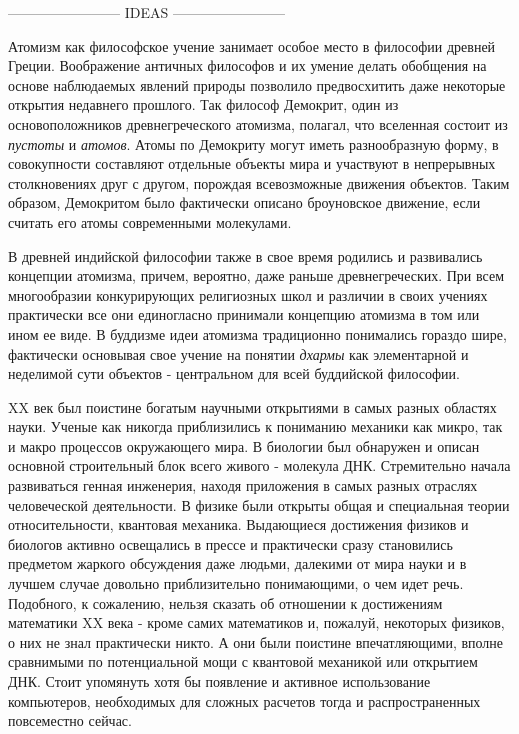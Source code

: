 ------------------------ IDEAS ------------------------ 





Атомизм как философское учение занимает особое место в философии древней Греции.
Воображение античных философов и их умение делать обобщения на основе наблюдаемых явлений природы позволило предвосхитить даже некоторые открытия недавнего прошлого.
Так философ Демокрит, один из основоположников древнегреческого атомизма, полагал, что вселенная состоит из \textit{пустоты} и \textit{атомов}. Атомы по Демокриту могут иметь разнообразную форму, в совокупности составляют отдельные объекты мира и участвуют в непрерывных столкновениях друг с другом, порождая всевозможные движения объектов.
Таким образом, Демокритом было фактически описано броуновское движение, если считать его атомы современными молекулами.

В древней индийской философии также в свое время родились и развивались концепции атомизма, причем, вероятно, даже раньше древнегреческих.
При всем многообразии конкурирующих религиозных школ и различии в своих учениях практически все они единогласно принимали концепцию атомизма в том или ином ее виде.
В буддизме идеи атомизма традиционно понимались гораздо шире, фактически основывая свое учение на понятии \textit{дхармы} как элементарной и неделимой сути объектов - центральном для всей буддийской философии.




XX век был поистине богатым научными открытиями в самых разных областях науки. Ученые как никогда приблизились к пониманию механики как микро, так и макро процессов окружающего мира. В биологии был обнаружен и описан основной строительный блок всего живого - молекула ДНК. Стремительно начала развиваться генная инженерия, находя приложения в самых разных отраслях человеческой деятельности. В физике были открыты общая и специальная теории относительности, квантовая механика. Выдающиеся достижения физиков и биологов активно освещались в прессе и практически сразу становились предметом жаркого обсуждения даже людьми, далекими от мира науки и в лучшем случае довольно приблизительно понимающими, о чем идет речь. 
Подобного, к сожалению, нельзя сказать об отношении к достижениям математики XX века - кроме самих математиков и, пожалуй, некоторых физиков, о них не знал практически никто. А они были поистине впечатляющими, вполне сравнимыми по потенциальной мощи с квантовой механикой или открытием ДНК. Стоит упомянуть хотя бы появление и активное использование компьютеров, необходимых для сложных расчетов тогда и распространенных повсеместно сейчас.

